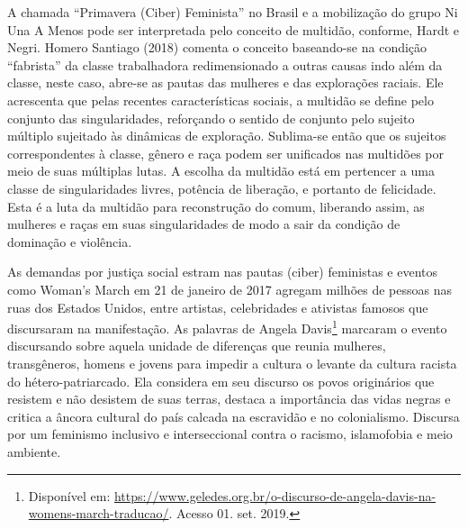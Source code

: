 A chamada ``Primavera (Ciber) Feminista'' no Brasil e a mobilização do
grupo Ni Una A Menos pode ser interpretada pelo conceito de multidão,
conforme, Hardt e Negri. Homero Santiago (2018) comenta o conceito
baseando-se na condição ``fabrista'' da classe trabalhadora
redimensionado a outras causas indo além da classe, neste caso, abre-se
as pautas das mulheres e das explorações raciais. Ele acrescenta que
pelas recentes características sociais, a multidão se define pelo
conjunto das singularidades, reforçando o sentido de conjunto pelo
sujeito múltiplo sujeitado às dinâmicas de exploração. Sublima-se então
que os sujeitos correspondentes à classe, gênero e raça podem ser
unificados nas multidões por meio de suas múltiplas lutas. A escolha da
multidão está em pertencer a uma classe de singularidades livres,
potência de liberação, e portanto de felicidade. Esta é a luta da
multidão para reconstrução do comum, liberando assim, as mulheres e
raças em suas singularidades de modo a sair da condição de dominação e
violência.

As demandas por justiça social estram nas pautas (ciber) feministas e
eventos como Woman's March em 21 de janeiro de 2017 agregam milhões de
pessoas nas ruas dos Estados Unidos, entre artistas, celebridades e
ativistas famosos que discursaram na manifestação. As palavras de Angela
Davis\footnote{Disponível em:
  \href{https://www.google.com/url?q=https\%3A\%2F\%2Fwww.geledes.org.br\%2Fo-discurso-de-angela-davis-na-womens-march-traducao\%2F\&sa=D\&sntz=1\&usg=AFQjCNEGpc8wutw2nGvkN4Otb5QWO8k07Q}{https://www.geledes.org.br/o-discurso-de-angela-davis-na-womens-march-traducao/}.
  Acesso 01. set. 2019.} marcaram o evento discursando sobre aquela
unidade de diferenças que reunia mulheres, transgêneros, homens e jovens
para impedir a cultura o levante da cultura racista do
hétero-patriarcado. Ela considera em seu discurso os povos originários
que resistem e não desistem de suas terras, destaca a importância das
vidas negras e critica a âncora cultural do país calcada na escravidão e
no colonialismo. Discursa por um feminismo inclusivo e interseccional
contra o racismo, islamofobia e meio ambiente.


